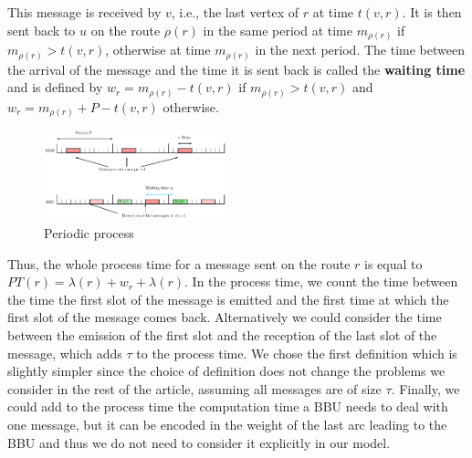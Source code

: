 \documentclass[10pt, conference, letterpaper]{IEEEtran}
\begin{document}
      This message is received by $v$, i.e., the last vertex of $r$ at time $t(v,r)$. It is then sent back to $u$ on the route $\rho(r)$ in the same period at time $m_{\rho(r)}$ if $m_{\rho(r)} > t(v,r)$, otherwise at time $m_{\rho(r)}$ in the next period. The time between the arrival of the message and the time it is sent back is called the \textbf{waiting time} and is defined by $w_r = m_{\rho(r)} - t(v,r)$ if $m_{\rho(r)} > t(v,r)$ and $w_r = m_{\rho(r)} + P - t(v,r)$ otherwise.
 
     \begin{figure}
      \begin{center}
      \includegraphics[width=0.47\textwidth]{rrh.pdf}
      \end{center}
      \caption{Periodic process}
      \end{figure}
      
      Thus, the whole process time for a message sent on the route $r$ is equal to
      $PT(r)=\lambda(r)+ w_r+\lambda(r)$.      
      In the process time, we count the time between the time the first slot of the message is emitted and the first time at which the first slot of the message comes back. Alternatively we could consider the time between the emission of the first slot and the reception of the last slot of the message, which adds $\tau$ to the process time.
      We chose the first definition which is slightly simpler since the choice of definition does not change the problems we consider in the rest of the article, assuming all messages are of size $\tau$.
      Finally, we could add to the process time the computation time a BBU needs to deal with one message, but it can be encoded  in the weight of the last arc leading to the BBU and thus we do not need to consider it explicitly in our model.
      
\end{document}
